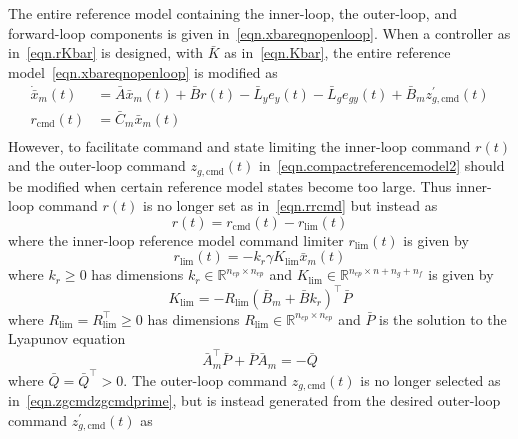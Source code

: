 The entire reference model containing the inner-loop, the outer-loop, and forward-loop components is given in\ \eqref{eqn.xbareqnopenloop}.
When a controller as in\ \eqref{eqn.rKbar} is designed, with $\bar{K}$ as in\ \eqref{eqn.Kbar}, the entire reference model\ \eqref{eqn.xbareqnopenloop} is modified as
\begin{equation}
  \label{eqn.compactreferencemodel2}
  \begin{split}
    \dot{\bar{x}}_{m}(t)
    &=
    \bar{A}\bar{x}_{m}(t) + \bar{B}r(t) - \bar{L}_{y}e_{y}(t) - \bar{L}_{g}e_{gy}(t) + \bar{B}_{m}z_{g,\text{cmd}}^{\prime}(t) \\
    r_{\text{cmd}}(t)
    &=
    \bar{C}_{m}\bar{x}_{m}(t) \\
  \end{split}
\end{equation}
However, to facilitate command and state limiting the inner-loop command $r(t)$ and the outer-loop command $z_{g,\text{cmd}}(t)$ in\ \eqref{eqn.compactreferencemodel2} should be modified when certain reference model states become too large.
Thus inner-loop command $r(t)$ is no longer set as in\ \eqref{eqn.rrcmd} but instead as
\begin{equation}
  \label{eqn.rrcmdrlim}
  r(t) = r_{\text{cmd}}(t) - r_{\text{lim}}(t)
\end{equation}
where the inner-loop reference model command limiter $r_{\text{lim}}(t)$ is given by
\begin{equation}
  \label{eqn.rlim}
  r_{\text{lim}}(t) = -k_{r}\gamma K_{\text{lim}}\bar{x}_{m}(t)
\end{equation}
where $k_{r}\geq0$ has dimensions $k_{r}\in\mathbb{R}^{n_{ep}\times n_{ep}}$ and $K_{\text{lim}}\in\mathbb{R}^{n_{ep}\times n+n_{g}+n_{f}}$ is given by
\begin{equation}
  \label{eqn.Klim}
  K_{\text{lim}} = - R_{\text{lim}}(\bar{B}_{m}+\bar{B}k_{r})^{\top}\bar{P}
\end{equation}
where $R_{\text{lim}} = R_{\text{lim}}^{\top}\geq0$ has dimensions $R_{\text{lim}}\in\mathbb{R}^{n_{ep}\times n_{ep}}$ and $\bar{P}$ is the solution to the Lyapunov equation
\begin{equation}
  \label{eqn.LyapEqnPbar}
  \bar{A}_{m}^{\top}\bar{P}+\bar{P}\bar{A}_{m} = -\bar{Q}
\end{equation}
where $\bar{Q}=\bar{Q}^{\top}>0$.
The outer-loop command $z_{g,\text{cmd}}(t)$ is no longer selected as in\ \eqref{eqn.zgcmdzgcmdprime}, but is instead generated from the desired outer-loop command $z_{g,\text{cmd}}^{\prime}(t)$ as
